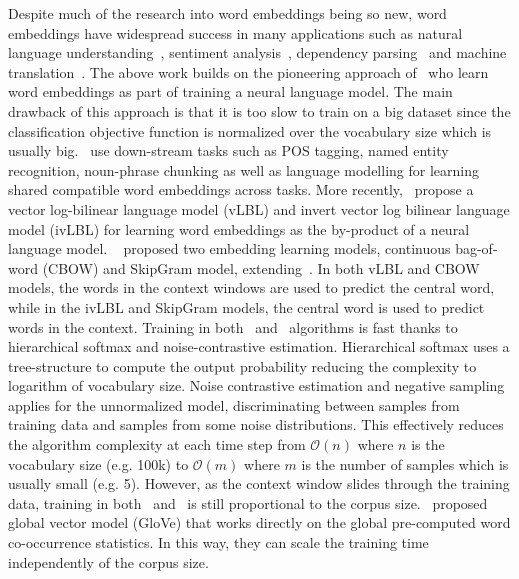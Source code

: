\documentclass[12pt,twoside,final,hidelinks]{ltthesis}
\theoremstyle{definition}
\begin{document}
Despite much of the research into word embeddings being so new, word embeddings have 
widespread success in many applications such as natural language 
understanding~\cite{Collobert:2008}, sentiment analysis~\cite{socher-EtAl:2013:EMNLP},
dependency parsing~\cite{dyer-EtAl:2015:ACL-IJCNLP} and machine 
translation~\cite{DBLP:journals/corr/BahdanauCB14}. 
The above work builds on the pioneering approach of~ 
who learn word embeddings as part of training a neural language model. The main drawback of 
this approach is that it is too slow to train on a big dataset since the classification objective function is 
normalized over the vocabulary size which is usually big.~ use down-stream 
tasks such as POS tagging, named entity recognition, noun-phrase chunking as well as  language modelling 
for learning shared compatible word embeddings across tasks. 
More recently,~ propose a vector log-bilinear language model (vLBL) and invert vector log bilinear language model (ivLBL) for learning word embeddings as the by-product of a neural language model.
~ proposed two embedding learning models, continuous bag-of-word (CBOW) 
and SkipGram model, extending~. In both vLBL and CBOW 
models, the words in the context windows are used to predict the central word, while in the ivLBL and SkipGram 
 models, the central word is used to predict words in the context. 
Training in both~ and~ algorithms is fast 
thanks to hierarchical softmax and noise-contrastive estimation. Hierarchical softmax uses a tree-structure 
to compute the output probability reducing the complexity to logarithm of vocabulary 
size. Noise contrastive estimation and negative sampling applies for the unnormalized model, 
discriminating between samples from training data and samples from some noise distributions. 
This effectively reduces the algorithm complexity at each time step from $\mathcal{O}(n)$ where $n$ is the vocabulary size (e.g. 100k) to $\mathcal{O}(m)$ where $m$ is the number of samples which is usually small (e.g. 5). 
However, as the context window slides through 
the training data, training in both~ 
and~ is still proportional to the corpus 
size.~ proposed global vector model (GloVe) that works directly on the 
global pre-computed word co-occurrence statistics. In this way, they can scale the training time independently of the corpus size. 
\end{document}

